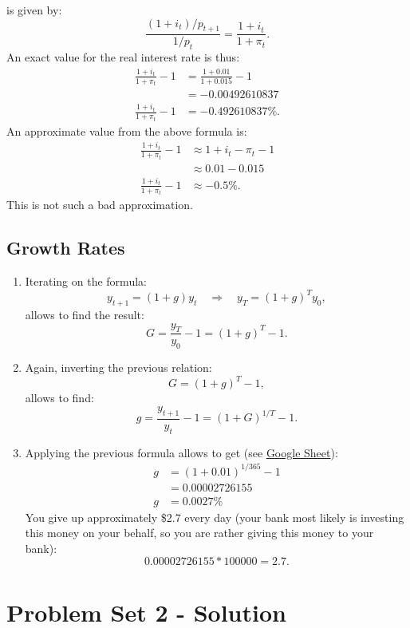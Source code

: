 \documentclass[]{book}
\begin{document}
\begin{enumerate}
  is given by: \[\frac{(1+i_t)/p_{t+1}}{1/p_t}=\frac{1+i_t}{1+\pi_t}.\]
  An exact value for the real interest rate is thus: \[\begin{aligned}
  \frac{1+i_t}{1+\pi_t}-1&=\frac{1+0.01}{1+0.015}-1\\
  &=-0.00492610837\\ 
  \frac{1+i_t}{1+\pi_t}-1&= -0.492610837\%.
  \end{aligned}\] An approximate value from the above formula is:
  \[\begin{aligned}
  \frac{1+i_t}{1+\pi_t}-1&\approx1+i_t-\pi_t-1\\
  &\approx0.01-0.015\\
  \frac{1+i_t}{1+\pi_t}-1&\approx-0.5\%.
  \end{aligned}\] This is not such a bad approximation.
\end{enumerate}

\section{Growth Rates}\label{growth-rates-1}

\begin{enumerate}
\def\labelenumi{\arabic{enumi}.}
\item
  Iterating on the formula:
  \[y_{t+1}=(1+g)y_t \quad \Rightarrow \quad y_T=(1+g)^Ty_0,\] allows to
  find the result: \[G = \frac{y_T}{y_0}-1=(1+g)^T-1.\]
\item
  Again, inverting the previous relation: \[G = (1+g)^T-1,\] allows to
  find: \[g = \frac{y_{t+1}}{y_{t}}-1=(1+G)^{1/T}-1.\]
\item
  Applying the previous formula allows to get (see
  \href{https://docs.google.com/spreadsheets/d/108I8xuosIQvgU6wOGrfwzHhE4p1OStgv8iIpzZ-4vME/edit?usp=sharing}{Google
  Sheet}): \[\begin{aligned}
  g &=(1+0.01)^{1/365}-1\\
   &= 0.00002726155\\
  g &=0.0027\%
  \end{aligned}\] You give up approximately \$2.7 every day (your bank
  most likely is investing this money on your behalf, so you are rather
  giving this money to your bank): \[0.00002726155*100000=2.7.\]
\end{enumerate}

\chapter{Problem Set 2 - Solution}\label{pset2-sol}
\end{document}

